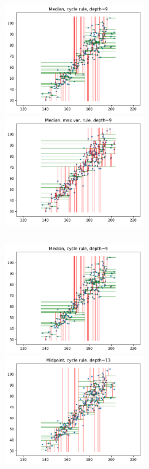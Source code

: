 \documentclass{beamer}
\begin{document}
\begin{frame}
	\begin{columns}[t]
		\centering
		\includegraphics[width=6cm]{graphics/median_cycle}\\
		\centering
		\includegraphics[width=6cm]{graphics/median_maxvar}\\
	\end{columns}
\end{frame}
\begin{frame}
\begin{columns}[t]
	\centering
	\includegraphics[width=6cm]{graphics/median_cycle}\\
	\centering
	\includegraphics[width=6cm]{graphics/midpoint_cycle}\\
\end{columns}
\end{frame}
\end{document}
